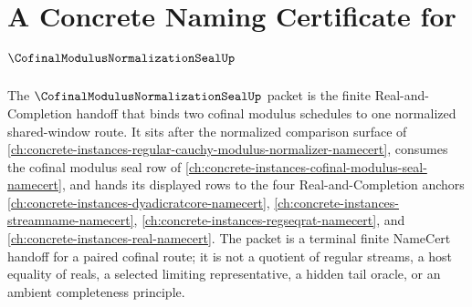 \chapter{A Concrete Naming Certificate for $\CofinalModulusNormalizationSealUp$}
\label{ch:concrete-instances-cofinal-modulus-normalization-seal-namecert}

The $\CofinalModulusNormalizationSealUp$ packet is the finite Real-and-Completion handoff that binds two cofinal modulus schedules to one normalized shared-window route. It sits after the normalized comparison surface of \autoref{ch:concrete-instances-regular-cauchy-modulus-normalizer-namecert}, consumes the cofinal modulus seal row of \autoref{ch:concrete-instances-cofinal-modulus-seal-namecert}, and hands its displayed rows to the four Real-and-Completion anchors \autoref{ch:concrete-instances-dyadicratcore-namecert}, \autoref{ch:concrete-instances-streamname-namecert}, \autoref{ch:concrete-instances-regseqrat-namecert}, and \autoref{ch:concrete-instances-real-namecert}. The packet is a terminal finite NameCert handoff for a paired cofinal route; it is not a quotient of regular streams, a host equality of reals, a selected limiting representative, a hidden tail oracle, or an ambient completeness principle.

